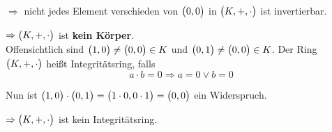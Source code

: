 \documentclass{scrreprt}
\begin{document}
\begin{enumerate}[(1)]
  $\Rightarrow$ nicht jedes Element verschieden von $\qty\big(0, 0)$ in
  $\qty\big(K, +, \cdot)$ ist invertierbar.

  $\Rightarrow \qty\big(K, +, \cdot)$ ist \textbf{kein Körper}. \\

  Offensichtlich sind $\qty\big(1, 0) \ne \qty\big(0, 0) \in K$
  und $\qty\big(0, 1) \ne \qty\big(0, 0) \in K$.
  Der Ring $\qty\big(K, +, \cdot)$ heißt Integritätsring, falls
  \[
    a \cdot b = 0 \Rightarrow a = 0 \lor b = 0
  \]

  Nun ist $\qty\big(1, 0) \cdot \qty\big(0, 1) = \qty\big(1 \cdot 0, 0 \cdot 1)
  = \qty\big(0, 0)$ ein Widerspruch.

  $\Rightarrow \qty\big(K, +, \cdot)$ ist kein Integritätsring.
\end{enumerate}
\end{document}
